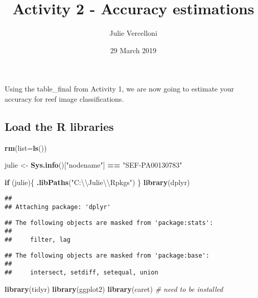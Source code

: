 \documentclass[]{article}
\title{Activity 2 - Accuracy estimations}
\author{Julie Vercelloni}
\date{29 March 2019}
\newenvironment{Shaded}{\begin{snugshade}}{\end{snugshade}}
\newcommand{\KeywordTok}[1]{\textcolor[rgb]{0.13,0.29,0.53}{\textbf{#1}}}
\newcommand{\DataTypeTok}[1]{\textcolor[rgb]{0.13,0.29,0.53}{#1}}
\newcommand{\CharTok}[1]{\textcolor[rgb]{0.31,0.60,0.02}{#1}}
\newcommand{\StringTok}[1]{\textcolor[rgb]{0.31,0.60,0.02}{#1}}
\newcommand{\CommentTok}[1]{\textcolor[rgb]{0.56,0.35,0.01}{\textit{#1}}}
\newcommand{\ControlFlowTok}[1]{\textcolor[rgb]{0.13,0.29,0.53}{\textbf{#1}}}
\newcommand{\OperatorTok}[1]{\textcolor[rgb]{0.81,0.36,0.00}{\textbf{#1}}}
\newcommand{\NormalTok}[1]{#1}
\begin{document}
\maketitle

Using the table\_final from Activity 1, we are now going to estimate
your accuracy for reef image classifications.

\subsection{Load the R libraries}\label{load-the-r-libraries}

\begin{Shaded}
\begin{Highlighting}[]
\KeywordTok{rm}\NormalTok{(}\DataTypeTok{list=}\KeywordTok{ls}\NormalTok{())}

\NormalTok{julie <-}\StringTok{ }\KeywordTok{Sys.info}\NormalTok{()[}\StringTok{"nodename"}\NormalTok{] }\OperatorTok{==}\StringTok{ "SEF-PA00130783"}

\ControlFlowTok{if}\NormalTok{ (julie)\{}
  \KeywordTok{.libPaths}\NormalTok{(}\StringTok{"C:}\CharTok{\textbackslash{}\textbackslash{}}\StringTok{Julie}\CharTok{\textbackslash{}\textbackslash{}}\StringTok{Rpkgs"}\NormalTok{)}
\NormalTok{\}}
\KeywordTok{library}\NormalTok{(dplyr)}
\end{Highlighting}
\end{Shaded}

\begin{verbatim}
## 
## Attaching package: 'dplyr'
\end{verbatim}

\begin{verbatim}
## The following objects are masked from 'package:stats':
## 
##     filter, lag
\end{verbatim}

\begin{verbatim}
## The following objects are masked from 'package:base':
## 
##     intersect, setdiff, setequal, union
\end{verbatim}

\begin{Shaded}
\begin{Highlighting}[]
\KeywordTok{library}\NormalTok{(tidyr)}
\KeywordTok{library}\NormalTok{(ggplot2)}
\KeywordTok{library}\NormalTok{(caret) }\CommentTok{# need to be installed }
\end{Highlighting}
\end{Shaded}
\end{document}
